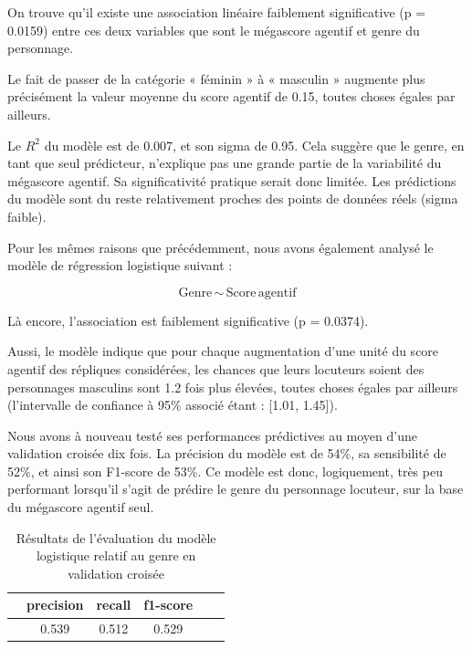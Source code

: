 On trouve qu’il existe une association linéaire faiblement significative (p = 0.0159) entre ces deux variables que sont le mégascore agentif et genre du personnage. 

Le fait de passer de la catégorie « féminin » à « masculin » augmente plus précisément la valeur moyenne du score agentif de 0.15, toutes choses égales par ailleurs.

Le $R^2$ du modèle est de 0.007, et son sigma de 0.95. Cela suggère que le genre, en tant que seul prédicteur, n'explique pas une grande partie de la variabilité du mégascore agentif. Sa significativité pratique serait donc limitée. Les prédictions du modèle sont du reste relativement proches des points de données réels (sigma faible).

Pour les mêmes raisons que précédemment, nous avons également analysé le modèle de régression logistique suivant : 

\begin{equation}
\text{Genre} \, \sim \, \text{Score} \, \text{agentif}
\end{equation}

Là encore, l’association est faiblement significative (p = 0.0374).

Aussi, le modèle indique que pour chaque augmentation d’une unité du score agentif des répliques considérées, les chances que leurs locuteurs soient des personnages masculins sont 1.2 fois plus élevées, toutes choses égales par ailleurs (l’intervalle de confiance à 95\% associé étant : [1.01, 1.45]). 

Nous avons à nouveau testé ses performances prédictives au moyen d’une validation croisée dix fois. La précision du modèle est de 54\%, sa sensibilité de 52\%, et ainsi son F1-score de 53\%. Ce modèle est donc, logiquement, très peu performant lorsqu’il s’agit de prédire le genre du personnage locuteur, sur la base du mégascore agentif seul.

\begin{table}[ht]
\caption{Résultats de l'évaluation du modèle logistique relatif au genre en validation croisée}
		\centering %
		\begin{tabular}{l c c c c c}
			\toprule
    			 & precision & recall & f1-score \\
			\toprule
			     & 0.539 & 0.512 & 0.529 \\
			\bottomrule
		\end{tabular}
            \label{Tab:logit_genre}
	\end{table} 

